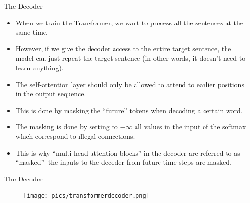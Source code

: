 \documentclass[handout]{beamer}
\begin{document}
\begin{frame}{The Decoder}
\begin{scriptsize}
\begin{itemize}
 \item When we train the Transformer, we want to process all the sentences at the same time. 
 
 \item However, if we give the decoder access to the entire target sentence, the model can just repeat the target sentence (in other words, it doesn't need to learn anything).
 
 \item The self-attention layer should only be allowed to attend to earlier positions in the output sequence.
 
 \item This is done by masking the ``future'' tokens when decoding a certain word.

  \item The masking is done by setting to $- \infty$ all values in the input of the softmax which correspond to illegal connections.
 \item This is why ``multi-head attention blocks'' in the decoder are referred to as ``masked'': the inputs to the decoder from future time-steps are masked.
 
 
\end{itemize}

\end{scriptsize}

\end{frame}


\begin{frame}{The Decoder}

     \begin{figure}[h]
        	\texttt{[image: pics/transformerdecoder.png]}
        \end{figure}  


\end{frame}
\end{document}
